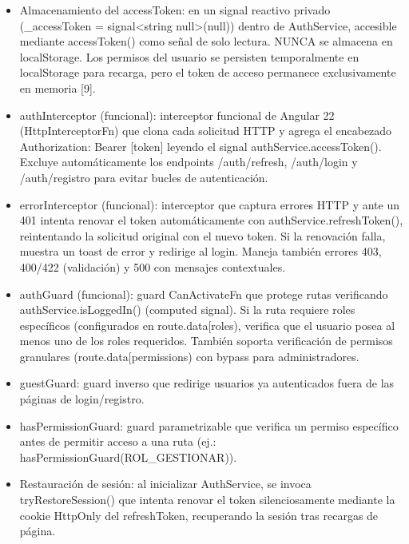 \documentclass[
]{article}
\begin{document}
\begin{itemize}
\item
  Almacenamiento del accessToken: en un signal reactivo privado
  (\_accessToken = signal\textless string \textbar{}
  null\textgreater(null)) dentro de AuthService, accesible mediante
  accessToken() como señal de solo lectura. NUNCA se almacena en
  localStorage. Los permisos del usuario se persisten temporalmente en
  localStorage para recarga, pero el token de acceso permanece
  exclusivamente en memoria {[}9{]}.
\item
  authInterceptor (funcional): interceptor funcional de Angular 22
  (HttpInterceptorFn) que clona cada solicitud HTTP y agrega el
  encabezado Authorization: Bearer {[}token{]} leyendo el signal
  authService.accessToken(). Excluye automáticamente los endpoints
  /auth/refresh, /auth/login y /auth/registro para evitar bucles de
  autenticación.
\item
  errorInterceptor (funcional): interceptor que captura errores HTTP y
  ante un 401 intenta renovar el token automáticamente con
  authService.refreshToken(), reintentando la solicitud original con el
  nuevo token. Si la renovación falla, muestra un toast de error y
  redirige al login. Maneja también errores 403, 400/422 (validación) y
  500 con mensajes contextuales.
\item
  authGuard (funcional): guard CanActivateFn que protege rutas
  verificando authService.isLoggedIn() (computed signal). Si la ruta
  requiere roles específicos (configurados en
  route.data{[}\textquotesingle roles\textquotesingle{]}), verifica que
  el usuario posea al menos uno de los roles requeridos. También soporta
  verificación de permisos granulares
  (route.data{[}\textquotesingle permissions\textquotesingle{]}) con
  bypass para administradores.
\item
  guestGuard: guard inverso que redirige usuarios ya autenticados fuera
  de las páginas de login/registro.
\item
  hasPermissionGuard: guard parametrizable que verifica un permiso
  específico antes de permitir acceso a una ruta (ej.:
  hasPermissionGuard(\textquotesingle ROL\_GESTIONAR\textquotesingle)).
\item
  Restauración de sesión: al inicializar AuthService, se invoca
  tryRestoreSession() que intenta renovar el token silenciosamente
  mediante la cookie HttpOnly del refreshToken, recuperando la sesión
  tras recargas de página.
\end{itemize}
\end{document}

